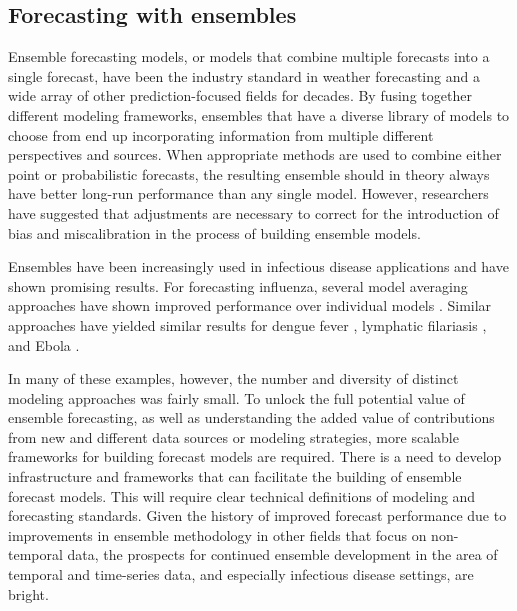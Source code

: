 \documentclass[a4paper]{article}
\begin{document}
\subsection{Forecasting with ensembles} \label{sec:ensembles}

Ensemble forecasting models, or models that combine multiple forecasts into a single forecast, have been the industry standard in weather forecasting and a wide array of other prediction-focused fields for decades. 
By fusing together different modeling frameworks, ensembles that have a diverse library of models to choose from end up incorporating information from multiple different perspectives and sources.\cite{Hastie2009}
When appropriate methods are used to combine either point or probabilistic forecasts, the resulting ensemble should in theory always have better long-run performance than any single model.\cite{bates1969combination,makridakis1983averages,clemen2007aggregating}
However, researchers have suggested that adjustments are necessary to correct for the introduction of bias\cite{granger1984improved} and miscalibration\cite{gneiting2013combining} in the process of building ensemble models.

Ensembles have been increasingly used in infectious disease applications and have shown promising results.
For forecasting influenza, several model averaging approaches have shown improved performance over individual models \cite{Yamana2017,ray2018prediction,reich2019multimodel}.
Similar approaches have yielded similar results for dengue fever \cite{yamana2016superensemble}, lymphatic filariasis \cite{Smith2017}, and Ebola \cite{viboud2017rapidd}.

In many of these examples, however, the number and diversity of distinct modeling approaches was fairly small.
To unlock the full potential value of ensemble forecasting, as well as understanding the added value of contributions from new and different data sources or modeling strategies, more scalable frameworks for building forecast models are required. 
There is a need to develop infrastructure and frameworks that can facilitate the building of ensemble forecast models.\cite{george2019} 
This will require clear technical definitions of modeling and forecasting standards.
Given the history of improved forecast performance due to improvements in ensemble methodology in other fields that focus on non-temporal data, the prospects for continued ensemble development in the area of temporal and time-series data, and especially infectious disease settings, are bright.
\end{document}
